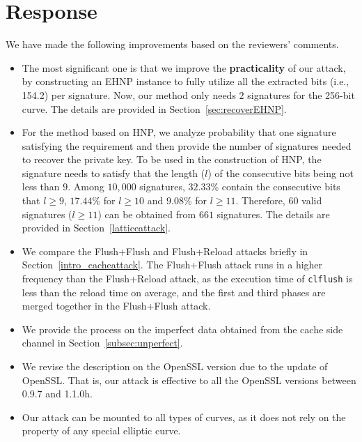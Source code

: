\section{Response}
We have made the following improvements based on the reviewers' comments. 
\begin{itemize}
  \item The most significant one is that we improve the \textbf{practicality} of our attack, by constructing an EHNP \cite{ehnp} instance to fully utilize all the extracted bits (i.e., 154.2) per signature.    Now, our method only needs $2$ signatures for the 256-bit curve. The details are provided in  Section~\ref{sec:recoverEHNP}.
  \item For the method based on HNP, we analyze probability that one signature satisfying the requirement and then provide the number of signatures needed to recover the private key.
    To be used in the construction of HNP,  the signature needs to satisfy that the length ($l$) of the consecutive bits being not less than $9$. 
   Among $10,000$ signatures, $32.33\%$ contain the consecutive bits that $l\geq9$, $17.44\%$ for $l\geq10$ and $9.08\%$ for $l\geq11$. 
   Therefore, $60$ valid signatures ($l\geq11$) can be obtained from $661$ signatures. The details are provided in Section~\ref{latticeattack}.
  \item We compare the Flush+Flush and Flush+Reload attacks briefly in Section~\ref{intro_cacheattack}. The Flush+Flush attack runs in a higher frequency than the Flush+Reload attack, as
   the execution time of \verb+clflush+ is less than the reload time on average,   and the first and  third phases are merged together in the Flush+Flush attack.
  \item We provide the process on the imperfect data obtained from the cache side channel in Section~\ref{subsec:unperfect}. 
  \item We revise the description on the OpenSSL version due to the update of OpenSSL. That is, our attack is effective to all the OpenSSL versions between 0.9.7 and 1.1.0h.
  \item Our attack can be mounted to all types of curves, as it does not rely on the property of any special elliptic curve.
\end{itemize}













